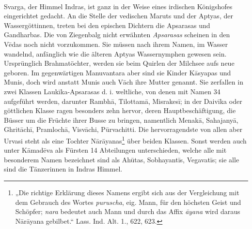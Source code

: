 \documentclass{article}
\begin{document}
\begin{center}
\end{center}
\paragraph{}
Svarga, der Himmel Indras, ist ganz in der Weise eines irdischen Königshofes eingerichtet gedacht. An die Stelle der vedischen Maruts und der Aptyas, der Wassergöttinnen, treten bei den epischen Dichtern die Apsarasas und Gandharbas. Die von Ziegenbalg nicht erwähnten \emph{Apsarasas} scheinen in den V\={e}das noch nicht vorzukommen. Sie müssen nach ihrem Namen, im Wasser wandelnd, anfänglich wie die älteren Aptyas Wassernymphen gewesen sein. Ursprünglich Brahmatöchter, werden sie beim Quirlen der Milchsee aufs neue geboren. Im gegenwärtigen Manuvantara aber sind sie Kinder K\={a}syapas und Munis, doch wird anstatt Munis auch V\={a}ch ihre Mutter genannt. Sie zerfallen in zwei Klassen Lauk\={i}ka-Apsarasas d. i. weltliche, von denen mit Namen 34 aufgeführt werden, darunter Rambh\={a}, Tilottam\={a}, Misrakes\={i}; in der Daiv\={i}ka oder göttlichen Klasse ragen besonders zehn hervor, deren Hauptbeschäftigung, die Büsser um die Früchte ihrer Busse zu bringen, namentlich Menak\={a}, Sahajany\={a}, Ghrit\={a}ch\={i}, Pramloch\={a}, Visv\={a}chi, P\={u}rvachitti. Die hervorragendste von allen aber Urvasi steht als eine Tochter N\={a}r\={a}yanas\footnote{„Die richtige Erklärung dieses Namens ergibt sich aus der Vergleichung mit dem Gebrauch des Wortes \emph{puruscha}, eig. Mann, für den höchsten Geist und Schöpfer; \emph{nara} bedeutet auch Mann und durch das Affix \emph{\={a}yana} wird daraus N\={a}r\={a}yana gebilbet.“ Lass. Ind. Alt. 1., 622, 623.} über beiden Klassen. Sonst werden auch unter K\={a}mad\={e}va als Fürsten 14 Abteilungen unterschieden, welche alle mit besonderem Namen bezeichnet sind als Ah\={u}tas, Sobhayant\={i}s, Vegavat\={i}s; sie alle sind die Tänzerinnen in Indras Himmel.
\end{document}

